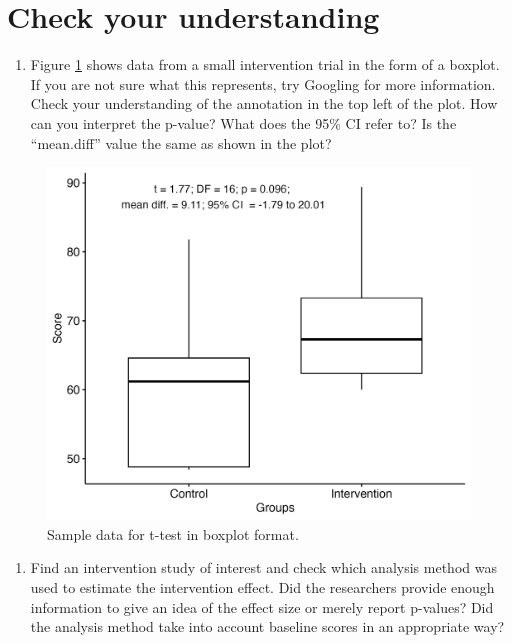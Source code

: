\documentclass{krantz}
\providecommand{\tightlist}{%
\setlength{\itemsep}{0pt}\setlength{\parskip}{0pt}}
\begin{document}
\hypertarget{check-your-understanding-11}{%
\section{Check your understanding}\label{check-your-understanding-11}}

\begin{enumerate}
\def\labelenumi{\arabic{enumi}.}
\tightlist
\item
  Figure \ref{fig:boxploteg} shows data from a small intervention trial in the form of a boxplot. If you are not sure what this represents, try Googling for more information. Check your understanding of the annotation in the top left of the plot. How can you interpret the p-value? What does the 95\% CI refer to? Is the ``mean.diff'' value the same as shown in the plot?
\end{enumerate}

\begin{figure}
\includegraphics[width=0.8\linewidth]{images_bw/boxeg} \caption{Sample data for t-test in boxplot format.}\label{fig:boxploteg}
\end{figure}



\begin{enumerate}
\def\labelenumi{\arabic{enumi}.}
\setcounter{enumi}{1}
\tightlist
\item
  Find an intervention study of interest and check which analysis method was used to estimate the intervention effect. Did the researchers provide enough information to give an idea of the effect size or merely report p-values? Did the analysis method take into account baseline scores in an appropriate way?
\end{enumerate}
\end{document}
